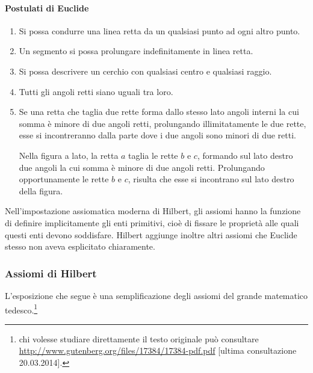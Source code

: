 \paragraph{Postulati di Euclide}
\begin{enumerate}[label=\Roman{*}.]
\item Si possa condurre una linea retta da un qualsiasi punto ad ogni 
altro punto.
\item Un segmento si possa prolungare indefinitamente in linea retta.
\item Si possa descrivere un cerchio con qualsiasi centro e qualsiasi 
raggio.
\item Tutti gli angoli retti siano uguali tra loro.
\item Se una retta che taglia due rette forma dallo stesso lato 
angoli interni la cui somma è minore di due angoli retti, prolungando 
illimitatamente le due rette, esse si incontreranno dalla parte dove 
i due angoli sono minori di due retti.

\begin{minipage}{.49\textwidth}
\centering
\end{minipage}\hfil
\begin{minipage}{.45\textwidth}
Nella figura a lato, la retta \(a\) taglia le rette \(b\) e \(c\), formando 
sul lato destro due angoli la cui somma è minore di due angoli retti. 
Prolungando opportunamente le rette \(b\) e \(c\), risulta che esse si 
incontrano sul lato destro della figura.
\end{minipage}
\end{enumerate}

Nell'impostazione assiomatica moderna di Hilbert, gli assiomi hanno 
la funzione di definire implicitamente gli enti primitivi, cioè di 
fissare le proprietà alle quali questi enti devono soddisfare. 
Hilbert aggiunge inoltre altri assiomi che Euclide stesso non aveva 
esplicitato chiaramente.

\subsubsection*{Assiomi di Hilbert}\label{sect:ass_Hilbert}

L'esposizione che segue è una semplificazione degli assiomi del 
grande matematico tedesco.\footnote{chi volesse studiare direttamente 
il testo originale può consultare 
\url{http://www.gutenberg.org/files/17384/17384-pdf.pdf} [ultima 
consultazione 20.03.2014].}

